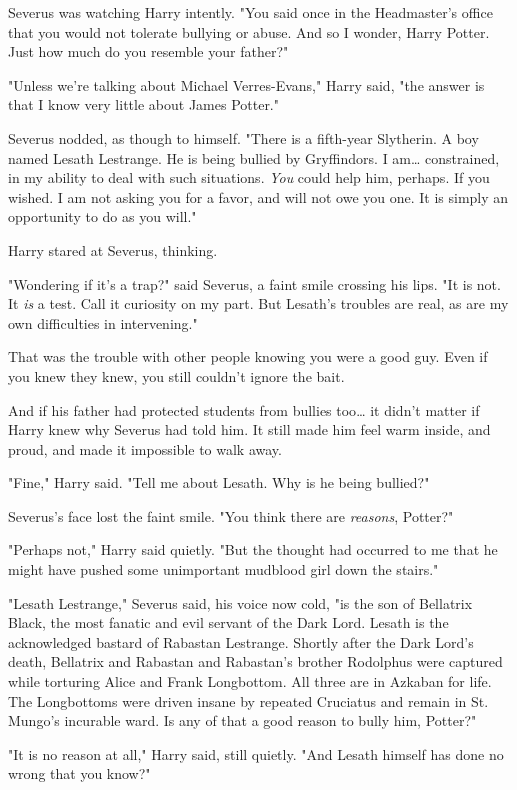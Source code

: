 Severus was watching Harry intently. "You said once in the Headmaster's office 
that you would not tolerate bullying or abuse. And so I wonder, Harry Potter. 
Just how much do you resemble your father?"

"Unless we're talking about Michael Verres-Evans," Harry said, "the answer is 
that I know very little about James Potter."

Severus nodded, as though to himself. "There is a fifth-year Slytherin. A boy 
named Lesath Lestrange. He is being bullied by Gryffindors. I am{\ldots} 
constrained, in my ability to deal with such situations. \emph{You} could help 
him, perhaps. If you wished. I am not asking you for a favor, and will not owe 
you one. It is simply an opportunity to do as you will."

Harry stared at Severus, thinking.

"Wondering if it's a trap?" said Severus, a faint smile crossing his lips. "It 
is not. It \emph{is} a test. Call it curiosity on my part. But Lesath's 
troubles are real, as are my own difficulties in intervening."

That was the trouble with other people knowing you were a good guy. Even if you 
knew they knew, you still couldn't ignore the bait.

And if his father had protected students from bullies too{\ldots} it didn't 
matter if Harry knew why Severus had told him. It still made him feel warm 
inside, and proud, and made it impossible to walk away.

"Fine," Harry said. "Tell me about Lesath. Why is he being bullied?"

Severus's face lost the faint smile. "You think there are \emph{reasons}, 
Potter?"

"Perhaps not," Harry said quietly. "But the thought had occurred to me that he 
might have pushed some unimportant mudblood girl down the stairs."

"Lesath Lestrange," Severus said, his voice now cold, "is the son of Bellatrix 
Black, the most fanatic and evil servant of the Dark Lord. Lesath is the 
acknowledged bastard of Rabastan Lestrange. Shortly after the Dark Lord's 
death, Bellatrix and Rabastan and Rabastan's brother Rodolphus were captured 
while torturing Alice and Frank Longbottom. All three are in Azkaban for life. 
The Longbottoms were driven insane by repeated Cruciatus and remain in St. 
Mungo's incurable ward. Is any of that a good reason to bully him, Potter?"

"It is no reason at all," Harry said, still quietly. "And Lesath himself has 
done no wrong that you know?"

